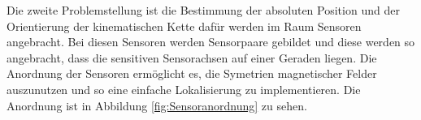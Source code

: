 Die zweite Problemstellung ist die Bestimmung der absoluten Position und der Orientierung der kinematischen Kette dafür werden im Raum Sensoren angebracht. Bei diesen Sensoren werden Sensorpaare gebildet und diese werden so angebracht, dass die sensitiven Sensorachsen auf einer Geraden liegen. Die Anordnung der Sensoren ermöglicht es, die Symetrien  magnetischer Felder auszunutzen und so eine einfache Lokalisierung zu implementieren. Die Anordnung ist in Abbildung \ref{fig:Sensoranordnung} zu sehen.


      
      